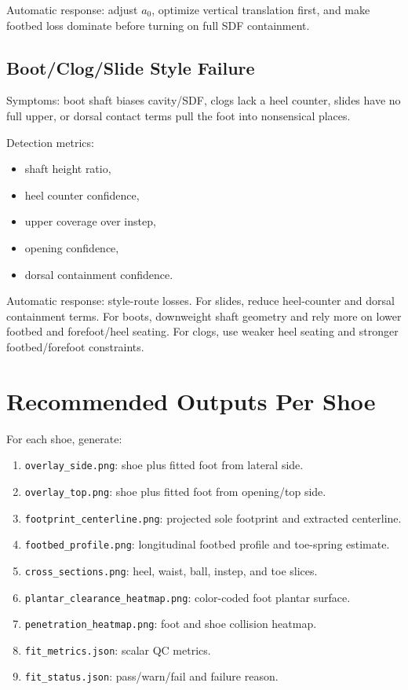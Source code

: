 \documentclass[11pt]{article}
\begin{document}
Automatic response: adjust $a_0$, optimize vertical translation first, and make footbed loss dominate before turning on full SDF containment.

\subsection{Boot/Clog/Slide Style Failure}

Symptoms: boot shaft biases cavity/SDF, clogs lack a heel counter, slides have no full upper, or dorsal contact terms pull the foot into nonsensical places.

Detection metrics:

\begin{itemize}
  \item shaft height ratio,
  \item heel counter confidence,
  \item upper coverage over instep,
  \item opening confidence,
  \item dorsal containment confidence.
\end{itemize}

Automatic response: style-route losses. For slides, reduce heel-counter and dorsal containment terms. For boots, downweight shaft geometry and rely more on lower footbed and forefoot/heel seating. For clogs, use weaker heel seating and stronger footbed/forefoot constraints.

\section{Recommended Outputs Per Shoe}

For each shoe, generate:

\begin{enumerate}
  \item \texttt{overlay\_side.png}: shoe plus fitted foot from lateral side.
  \item \texttt{overlay\_top.png}: shoe plus fitted foot from opening/top side.
  \item \texttt{footprint\_centerline.png}: projected sole footprint and extracted centerline.
  \item \texttt{footbed\_profile.png}: longitudinal footbed profile and toe-spring estimate.
  \item \texttt{cross\_sections.png}: heel, waist, ball, instep, and toe slices.
  \item \texttt{plantar\_clearance\_heatmap.png}: color-coded foot plantar surface.
  \item \texttt{penetration\_heatmap.png}: foot and shoe collision heatmap.
  \item \texttt{fit\_metrics.json}: scalar QC metrics.
  \item \texttt{fit\_status.json}: pass/warn/fail and failure reason.
\end{enumerate}
\end{document}
